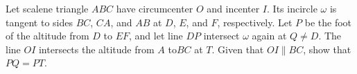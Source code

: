 Let scalene triangle $ABC$ have circumcenter $O$ and incenter $I$.
Its incircle $\omega$ is tangent to sides $BC$, $CA$, and $AB$ at $D$, $E$, and $F$, respectively.
Let $P$ be the foot of the altitude from $D$ to $EF$, and let line $DP$ intersect $\omega$ again at $Q \ne D$.
The line $OI$ intersects the altitude from $A$ to$ BC$ at $T$.
Given that $OI \parallel BC$, show that $PQ=PT$.
